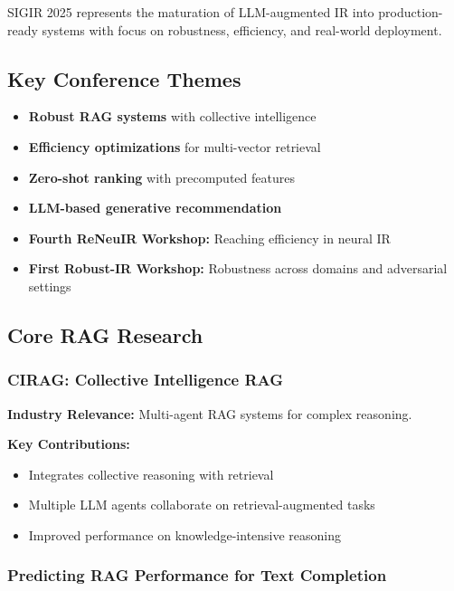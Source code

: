 \documentclass[11pt,letterpaper]{article}
\begin{document}
SIGIR 2025 represents the maturation of LLM-augmented IR into production-ready systems with focus on robustness, efficiency, and real-world deployment.

\subsection{Key Conference Themes}

\begin{itemize}[leftmargin=*]
    \item \textbf{Robust RAG systems} with collective intelligence
    \item \textbf{Efficiency optimizations} for multi-vector retrieval
    \item \textbf{Zero-shot ranking} with precomputed features
    \item \textbf{LLM-based generative recommendation}
    \item \textbf{Fourth ReNeuIR Workshop:} Reaching efficiency in neural IR
    \item \textbf{First Robust-IR Workshop:} Robustness across domains and adversarial settings
\end{itemize}

\subsection{Core RAG Research}

\subsubsection{CIRAG: Collective Intelligence RAG}

\textbf{Industry Relevance:} Multi-agent RAG systems for complex reasoning.

\textbf{Key Contributions:}
\begin{itemize}[leftmargin=*]
    \item Integrates collective reasoning with retrieval
    \item Multiple LLM agents collaborate on retrieval-augmented tasks
    \item Improved performance on knowledge-intensive reasoning
\end{itemize}

\subsubsection{Predicting RAG Performance for Text Completion}
\end{document}
